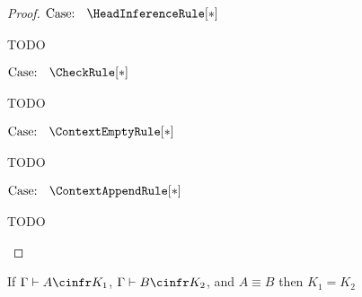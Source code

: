 \begin{proof}
    $\text{Case: }\begin{array}{c} \HeadInferenceRule[*] \end{array}$
    \begin{proofcase}
        TODO
    \end{proofcase}

    $\text{Case: }\begin{array}{c} \CheckRule[*] \end{array}$
    \begin{proofcase}
        TODO
    \end{proofcase}

    $\text{Case: }\begin{array}{c} \ContextEmptyRule[*] \end{array}$
    \begin{proofcase}
        TODO
    \end{proofcase}

    $\text{Case: }\begin{array}{c} \ContextAppendRule[*] \end{array}$
    \begin{proofcase}
        TODO
    \end{proofcase}
\end{proof}


\begin{lemma}
    If $\Gamma \vdash A \cinfr K_1$, $\Gamma \vdash B \cinfr K_2$, and $A \equiv B$ then $K_1 = K_2$
    \label{lem:2:conv_proof_force_equal_types}
\end{lemma}



